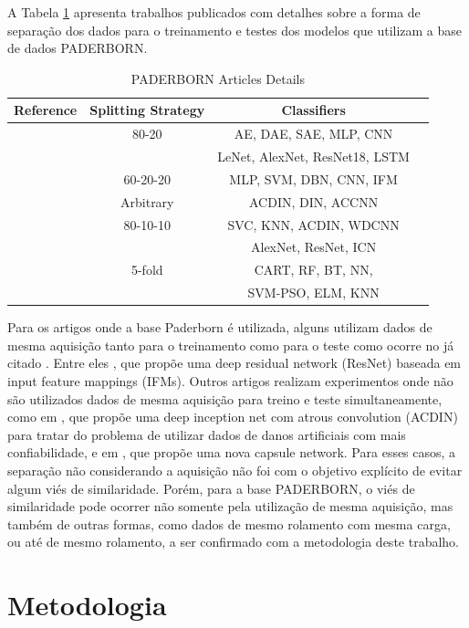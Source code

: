 \documentclass[conference]{IEEEtran}
\begin{document}
A Tabela \ref{tab5} apresenta trabalhos publicados com detalhes sobre a forma de separação dos dados para o treinamento e testes dos modelos que utilizam a base de dados PADERBORN.

\begin{table}[htbp]
\caption{PADERBORN Articles Details}
\begin{center}
\begin{tabular}{|c|c|c|c|}
\hline
\textbf{Reference}&{\textbf{Splitting Strategy}}&{\textbf{Classifiers}}\\
\hline
\cite{b5}&80-20&AE, DAE, SAE, MLP, CNN\\
&&LeNet, AlexNet, ResNet18, LSTM\\
\cite{b10}&60-20-20&MLP, SVM, DBN, CNN, IFM\\
\cite{b11}&Arbitrary&ACDIN, DIN, ACCNN\\
\cite{b12}&80-10-10&SVC, KNN, ACDIN, WDCNN\\
&&AlexNet, ResNet, ICN\\
\cite{b14}&5-fold&CART, RF, BT, NN,\\
&&SVM-PSO, ELM, KNN\\
\hline
\end{tabular}
\label{tab5}
\end{center}
\end{table}

Para os artigos onde a base Paderborn é utilizada, alguns utilizam dados de mesma aquisição tanto para o treinamento como para o teste como ocorre no já citado \cite{b5}.
Entre eles \cite{b10}, que propõe uma deep residual network (ResNet) baseada em input feature mappings (IFMs).
Outros artigos realizam experimentos onde não são utilizados dados de mesma aquisição para treino e teste simultaneamente, como em \cite{b11}, que propõe uma deep inception net com atrous convolution (ACDIN) para tratar do problema de utilizar dados de danos artificiais com mais confiabilidade, e em \cite{b12}, que propõe uma nova capsule network.
Para esses casos, a separação não considerando a aquisição não foi com o objetivo explícito de evitar algum viés de similaridade.
Porém, para a base PADERBORN, o viés de similaridade pode ocorrer não somente pela utilização de mesma aquisição, mas também de outras formas, como dados de mesmo rolamento com mesma carga, ou até de mesmo rolamento, a ser confirmado com a metodologia deste trabalho.

\section{Metodologia}
\end{document}
